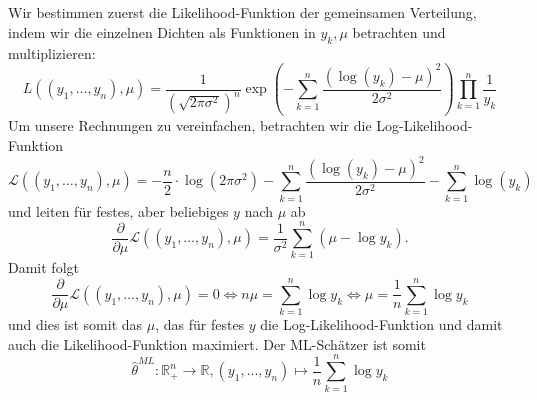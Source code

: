 \documentclass[a4paper]{article}
\begin{document}
\subsection{}

Wir bestimmen zuerst die Likelihood-Funktion der gemeinsamen Verteilung, indem wir die einzelnen Dichten als Funktionen in $y_k, \mu$ betrachten und multiplizieren:
\begin{equation*}
    L((y_1, \dots, y_n), \mu) = \frac{1}{(\sqrt{2 \pi \sigma^2})^n} \exp\left( - \sum_{k=1}^n \frac{(\log(y_k) - \mu)^2}{2 \sigma^2} \right) \prod_{k = 1}^n \frac{1}{y_k}
\end{equation*}
Um unsere Rechnungen zu vereinfachen, betrachten wir die Log-Likelihood-Funktion
\begin{equation*}
    \mathcal{L}((y_1, \dots, y_n), \mu) = -\frac{n}{2} \cdot \log\left(2 \pi \sigma^2 \right) - \sum_{k=1}^n \frac{(\log(y_k) - \mu)^2}{2 \sigma^2} - \sum_{k = 1}^{n} \log(y_k)
\end{equation*}
und leiten für festes, aber beliebiges $y$ nach $\mu$ ab
\begin{equation*}
    \frac{\partial}{\partial \mu} \mathcal{L}((y_1, \dots, y_n), \mu) = \frac{1}{\sigma^2} \sum_{k=1}^n (\mu - \log y_k)\text{.}
\end{equation*}
Damit folgt
\begin{equation*}
    \frac{\partial}{\partial \mu} \mathcal{L}((y_1, \dots, y_n), \mu) = 0 \iff n \mu = \sum_{k = 1}^{n} \log y_k \iff \mu = \frac{1}{n} \sum_{k = 1}^{n} \log y_k
\end{equation*}
und dies ist somit das $\mu$, das für festes $y$ die Log-Likelihood-Funktion und damit auch die Likelihood-Funktion maximiert.
Der ML-Schätzer ist somit
\begin{equation*}
    \hat{\theta}^{ML}: \mathds{R}_+^n \to \mathds{R}, (y_1, \dots, y_n) \mapsto \frac{1}{n} \sum_{k=1}^{n} \log y_k
\end{equation*}

\subsection{}
\end{document}
